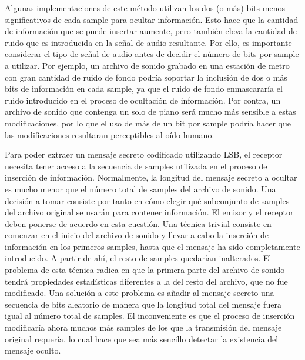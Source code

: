 \documentclass[12pt]{article}
\begin{document}
Algunas implementaciones de este método utilizan los dos (o más) bits menos significativos de cada sample para ocultar información. Esto hace que la cantidad de información que se puede insertar aumente, pero también eleva la cantidad de ruido que es introducida en la señal de audio resultante. Por ello, es importante considerar el tipo de señal de audio antes de decidir el número de bits por sample a utilizar. Por ejemplo, un archivo de sonido grabado en una estación de metro con gran cantidad de ruido de fondo podría soportar la inclusión de dos o más bits de información en cada sample, ya que el ruido de fondo enmascararía el ruido introducido en el proceso de ocultación de información. Por contra, un archivo de sonido que contenga un solo de piano será mucho más sensible a estas modificaciones, por lo que el uso de más de un bit por sample podría hacer que las modificaciones resultaran perceptibles al oído humano.

Para poder extraer un mensaje secreto codificado utilizando LSB, el receptor necesita tener acceso a la secuencia de samples utilizada en el proceso de inserción de información. Normalmente, la longitud del mensaje secreto a ocultar es mucho menor que el número total de samples del archivo de sonido. Una decisión a tomar consiste por tanto en cómo elegir qué subconjunto de samples del archivo original se usarán para contener información. El emisor y el receptor deben ponerse de acuerdo en esta cuestión. Una técnica trivial consiste en comenzar en el inicio del archivo de sonido y llevar a cabo la inserción de información en los primeros samples, hasta que el mensaje ha sido completamente introducido. A partir de ahí, el resto de samples quedarían inalterados. El problema de esta técnica radica en que la primera parte del archivo de sonido tendrá propiedades estadísticas diferentes a la del resto del archivo, que no fue modificado. Una solución a este problema es añadir al mensaje secreto una secuencia de bits aleatorio de manera que la longitud total del mensaje fuera igual al número total de samples. El inconveniente es que el proceso de inserción modificaría ahora muchos más samples de los que la transmisión del mensaje original requería, lo cual hace que sea más sencillo detectar la existencia del mensaje oculto.
\end{document}
